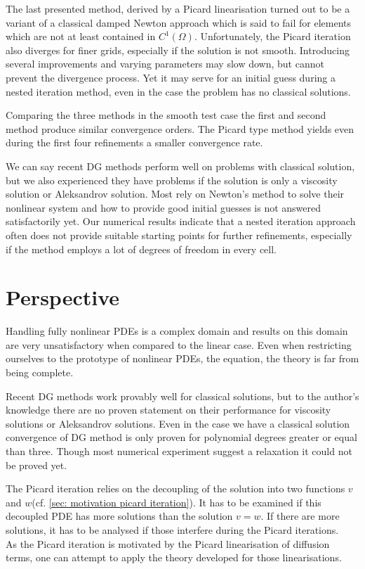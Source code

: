 The last presented method, derived by a Picard linearisation turned out to be a variant of a classical damped Newton approach which is said to fail for elements which are not at least contained in $C^1(\Omega)$.
Unfortunately, the Picard iteration also diverges for finer grids, especially if the solution is not smooth. Introducing several improvements and varying parameters may slow down, but cannot prevent the divergence process. Yet it may serve for an initial guess during a nested iteration method, even in the case the problem has no classical solutions.

Comparing the three methods in the smooth test case the first and second method produce similar convergence orders. %
The Picard type method yields even during the first four refinements a smaller convergence rate. 

We can say recent DG methods perform well on problems with classical solution, but we also experienced they have problems if the \MA solution is only a viscosity solution or Aleksandrov solution. Most rely on Newton's method to solve their nonlinear system and how to provide good initial guesses is not answered satisfactorily yet.
Our numerical results indicate that a nested iteration approach often does not provide suitable starting points for further refinements, especially if the method employs a lot of degrees of freedom in every cell.

\section{Perspective}
Handling fully nonlinear PDEs is a complex domain and results on this domain are very unsatisfactory when compared to the linear case. Even when restricting ourselves to the prototype of nonlinear PDEs, the \MA equation, the theory is far from being complete. %

Recent DG methods work provably well for classical solutions, but to the author's knowledge there are no proven statement on their performance for viscosity solutions or Aleksandrov solutions. Even in the case we have a classical solution convergence of DG method is only proven for polynomial degrees greater or equal than three. Though most numerical experiment suggest a relaxation it could not be proved yet.

The Picard iteration relies on the decoupling of the solution into two functions $v$ and $w$(cf. \ref{sec: motivation picard iteration}). It has to be examined if this decoupled PDE has more solutions than the solution $v=w$. If there are more solutions, it has to be analysed if those interfere during the Picard iterations. \\
As the Picard iteration is motivated by the Picard linearisation of diffusion terms, one can attempt to apply the theory developed for those linearisations.

